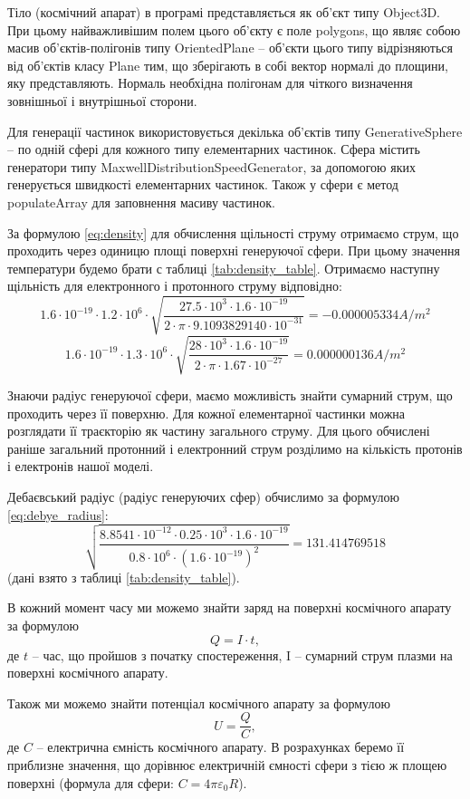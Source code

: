 \documentclass[a4paper,12pt]{article}
\begin{document}
Тіло (космічний апарат) в програмі представляється як об’єкт типу Object3D. При цьому найважливішим полем цього об’єкту є поле polygons, що являє собою масив об’єктів-полігонів типу OrientedPlane -- об’єкти цього типу відрізняються від об’єктів класу Plane тим, що зберігають в собі вектор нормалі до площини, яку представляють. Нормаль необхідна полігонам для чіткого визначення зовнішньої і внутрішньої сторони.

Для генерації частинок використовується декілька об’єктів типу GenerativeSphere -- по одній сфері для кожного типу елементарних частинок. Сфера містить генератори типу MaxwellDistributionSpeedGenerator, за допомогою яких генерується швидкості елементарних частинок. Також у сфери є метод populateArray для заповнення масиву частинок.

За формулою \ref{eq:density} для обчислення щільності струму отримаємо струм, що проходить через одиницю площі поверхні генеруючої сфери. При цьому значення температури будемо брати с таблиці \ref{tab:density_table}. Отримаємо наступну щільність для електронного і протонного струму відповідно:
\[1.6 \cdot 10^{-19} \cdot 1.2 \cdot 10^6 \cdot \sqrt{\frac{27.5 \cdot 10^3 \cdot 1.6 \cdot 10^{-19}}{2 \cdot \pi \cdot 9.1093829140 \cdot 10^{-31}}} = -0.000005334 A/m^2\]
\[1.6 \cdot 10^{-19} \cdot 1.3 \cdot 10^6 \cdot \sqrt{\frac{28 \cdot 10^3 \cdot 1.6 \cdot 10^{-19}}{2 \cdot \pi \cdot 1.67 \cdot 10^{-27}}} = 0.000000136 A/m^2\]

Знаючи радіус генеруючої сфери, маємо можливість знайти сумарний струм, що проходить через її поверхню. Для кожної елементарної частинки можна розглядати її траєкторію як частину загального струму. Для цього обчислені раніше загальний протонний і електронний струм розділимо на кількість протонів і електронів нашої моделі.

Дебаєвський радіус (радіус генеруючих сфер) обчислимо за формулою \ref{eq:debye_radius}:
\[\sqrt{\frac{8.8541 \cdot 10^{-12} \cdot 0.25 \cdot 10^3 \cdot 1.6 \cdot 10^{-19}}{0.8 \cdot 10^6 \cdot (1.6 \cdot 10^{-19})^2}} = 131.414769518\]
(дані взято з таблиці \ref{tab:density_table}).

В кожний момент часу ми можемо знайти заряд на поверхні космічного апарату за формулою
\[Q = I \cdot t,\]
де $t$ -- час, що пройшов з початку спостереження, I -- сумарний струм плазми на поверхні космічного апарату.

Також ми можемо знайти потенціал космічного апарату за формулою
\[U = \frac{Q}{C},\]
де $C$ -- електрична ємність космічного апарату. В розрахунках беремо її приблизне значення, що дорівнює електричній ємності сфери з тією ж площею поверхні (формула для сфери: $C = 4 \pi \varepsilon_0 R$).
\end{document}
